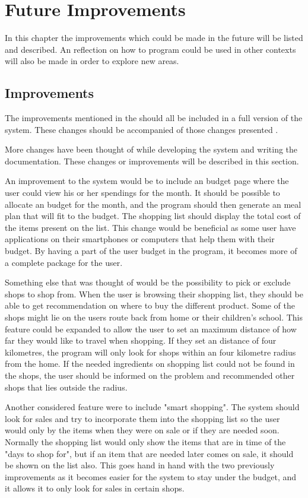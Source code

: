 \chapter{Future Improvements}
In this chapter the improvements which could be made in the future will be listed and described. An reflection on how to program could be used in other contexts will also be made in order to explore new areas.

\section{Improvements}
The improvements mentioned in the  should all be included in a full version of the system. These changes should be accompanied of those changes presented .

More changes have been thought of while developing the system and writing the documentation. These changes or improvements will be described in this section.

An improvement to the system would be to include an budget page where the user could view his or her spendings for the month. It should be possible to allocate an budget for the month, and the program should then generate an meal plan that will fit to the budget. The shopping list should display the total cost of the items present on the list. This change would be beneficial as some user have applications on their smartphones or computers that help them with their budget. By having a part of the user budget in the program, it becomes more of a complete package for the user.

Something else that was thought of would be the possibility to pick or exclude shops to shop from. When the user is browsing their shopping list, they should be able to get recommendation on where to buy the different product. Some of the shops might lie on the users route back from home or their children's school. This feature could be expanded to allow the user to set an maximum distance of how far they would like to travel when shopping. If they set an distance of four kilometres, the program will only look for shops within an four kilometre radius from the home. If the needed ingredients on shopping list could not be found in the shops, the user should be informed on the problem and recommended other shops that lies outside the radius. 

Another considered feature were to include "smart shopping". The system should look for sales and try to incorporate them into the shopping list so the user would only by the items when they were on sale or if they are needed soon. Normally the shopping list would only show the items that are in time of the "days to shop for", but if an item that are needed later comes on sale, it should be shown on the list also. This goes hand in hand with the two previously improvements as it becomes easier for the system to stay under the budget, and it allows it to only look for sales in certain shops.

